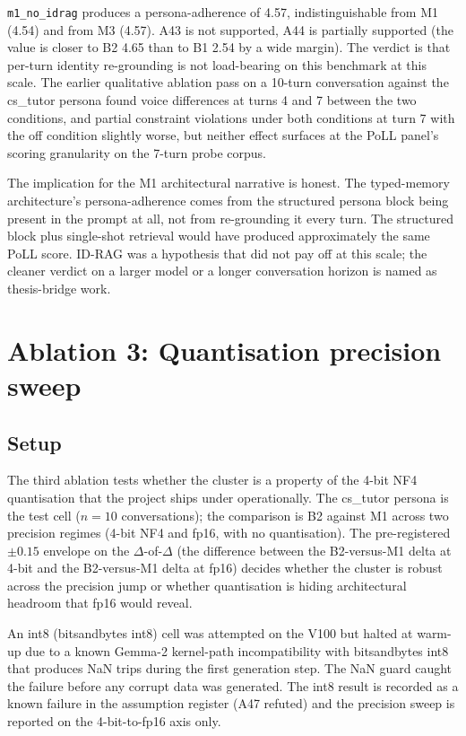 \texttt{m1\_no\_idrag} produces a persona-adherence of 4.57, indistinguishable from M1 (4.54) and from M3 (4.57). A43 is not supported, A44 is partially supported (the value is closer to B2 4.65 than to B1 2.54 by a wide margin). The verdict is that per-turn identity re-grounding is not load-bearing on this benchmark at this scale. The earlier qualitative ablation pass on a 10-turn conversation against the cs\_tutor persona found voice differences at turns 4 and 7 between the two conditions, and partial constraint violations under both conditions at turn 7 with the off condition slightly worse, but neither effect surfaces at the PoLL panel's scoring granularity on the 7-turn probe corpus.

The implication for the M1 architectural narrative is honest. The typed-memory architecture's persona-adherence comes from the structured persona block being present in the prompt at all, not from re-grounding it every turn. The structured block plus single-shot retrieval would have produced approximately the same PoLL score. ID-RAG was a hypothesis that did not pay off at this scale; the cleaner verdict on a larger model or a longer conversation horizon is named as thesis-bridge work.

\section{Ablation 3: Quantisation precision sweep}
\label{sec:quant-sweep}

\subsection{Setup}

The third ablation tests whether the cluster is a property of the 4-bit NF4 quantisation that the project ships under operationally. The cs\_tutor persona is the test cell ($n = 10$ conversations); the comparison is B2 against M1 across two precision regimes (4-bit NF4 and fp16, with no quantisation). The pre-registered $\pm 0.15$ envelope on the $\Delta$-of-$\Delta$ (the difference between the B2-versus-M1 delta at 4-bit and the B2-versus-M1 delta at fp16) decides whether the cluster is robust across the precision jump or whether quantisation is hiding architectural headroom that fp16 would reveal.

An int8 (bitsandbytes int8) cell was attempted on the V100 but halted at warm-up due to a known Gemma-2 kernel-path incompatibility with bitsandbytes int8 that produces NaN trips during the first generation step. The NaN guard caught the failure before any corrupt data was generated. The int8 result is recorded as a known failure in the assumption register (A47 refuted) and the precision sweep is reported on the 4-bit-to-fp16 axis only.

